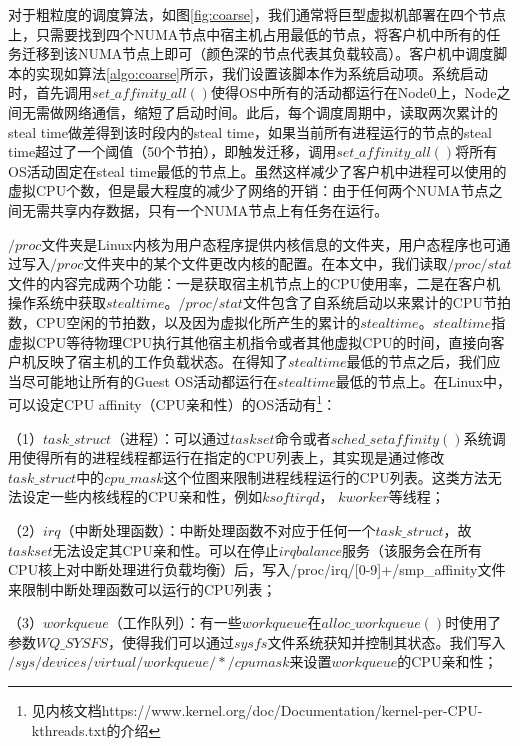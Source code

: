 对于粗粒度的调度算法，如图\ref{fig:coarse}，我们通常将巨型虚拟机部署在四个节点上，只需要找到四个NUMA节点中宿主机占用最低的节点，将客户机中所有的任务迁移到该NUMA节点上即可（颜色深的节点代表其负载较高）。客户机中调度脚本的实现如算法\ref{algo:coarse}所示，我们设置该脚本作为系统启动项。系统启动时，首先调用$set\_affinity\_all()$使得OS中所有的活动都运行在Node0上，Node之间无需做网络通信，缩短了启动时间。此后，每个调度周期中，读取两次累计的steal time做差得到该时段内的steal time，如果当前所有进程运行的节点的steal time超过了一个阈值（50个节拍），即触发迁移，调用$set\_affinity\_all()$将所有OS活动固定在steal time最低的节点上。虽然这样减少了客户机中进程可以使用的虚拟CPU个数，但是最大程度的减少了网络的开销：由于任何两个NUMA节点之间无需共享内存数据，只有一个NUMA节点上有任务在运行。

$/proc$文件夹是Linux内核为用户态程序提供内核信息的文件夹，用户态程序也可通过写入$/proc$文件夹中的某个文件更改内核的配置。在本文中，我们读取$/proc/stat$文件的内容完成两个功能：一是获取宿主机节点上的CPU使用率，二是在客户机操作系统中获取$steal time$。$/proc/stat$文件包含了自系统启动以来累计的CPU节拍数，CPU空闲的节拍数，以及因为虚拟化所产生的累计的$steal time$。$steal time$指虚拟CPU等待物理CPU执行其他宿主机指令或者其他虚拟CPU的时间，直接向客户机反映了宿主机的工作负载状态。在得知了$steal time$最低的节点之后，我们应当尽可能地让所有的Guest OS活动都运行在$steal time$最低的节点上。在Linux中，可以设定CPU affinity（CPU亲和性）的OS活动有\footnote{见内核文档https://www.kernel.org/doc/Documentation/kernel-per-CPU-kthreads.txt的介绍}：

（1）$task\_struct$（进程）：可以通过$taskset$命令或者$sched\_setaffinity()$系统调用使得所有的进程线程都运行在指定的CPU列表上，其实现是通过修改$task\_struct$中的$cpu\_mask$这个位图来限制进程线程运行的CPU列表。这类方法无法设定一些内核线程的CPU亲和性，例如$ksoftirqd$， $kworker$等线程；

（2）$irq$（中断处理函数）：中断处理函数不对应于任何一个$task\_struct$，故$taskset$无法设定其CPU亲和性。可以在停止$irqbalance$服务（该服务会在所有CPU核上对中断处理进行负载均衡）后，写入/proc/irq/[0-9]+/smp\_affinity文件来限制中断处理函数可以运行的CPU列表；

（3）$workqueue$（工作队列）：有一些$workqueue$在$alloc\_workqueue()$时使用了参数$WQ\_SYSFS$，使得我们可以通过$sysfs$文件系统获知并控制其状态。我们写入$/sys/devices/virtual/workqueue/*/cpumask$来设置$workqueue$的CPU亲和性；

